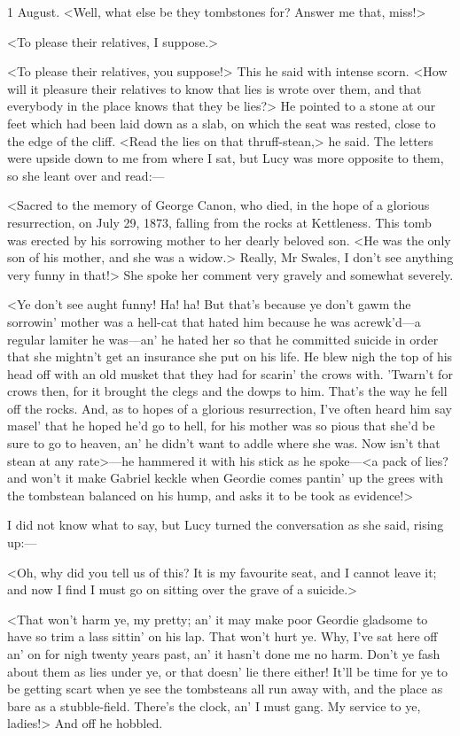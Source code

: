 \begin{diary}{1 August.}
<Well, what else be they tombstones for? Answer me that, miss!>

<To please their relatives, I suppose.>

<To please their relatives, you suppose!> This he said with intense scorn. <How will it pleasure their relatives to know that lies is wrote over them, and that everybody in the place knows that they be lies?> He pointed to a stone at our feet which had been laid down as a slab, on which the seat was rested, close to the edge of the cliff. <Read the lies on that thruff-stean,> he said. The letters were upside down to me from where I sat, but Lucy was more opposite to them, so she leant over and read:—

<Sacred to the memory of George Canon, who died, in the hope of a glorious resurrection, on July 29, 1873, falling from the rocks at Kettleness. This tomb was erected by his sorrowing mother to her dearly beloved son. <He was the only son of his mother, and she was a widow.> Really, Mr Swales, I don't see anything very funny in that!> She spoke her comment very gravely and somewhat severely.

<Ye don't see aught funny! Ha! ha! But that's because ye don't gawm the sorrowin' mother was a hell-cat that hated him because he was acrewk'd—a regular lamiter he was—an' he hated her so that he committed suicide in order that she mightn't get an insurance she put on his life. He blew nigh the top of his head off with an old musket that they had for scarin' the crows with. 'Twarn't for crows then, for it brought the clegs and the dowps to him. That's the way he fell off the rocks. And, as to hopes of a glorious resurrection, I've often heard him say masel' that he hoped he'd go to hell, for his mother was so pious that she'd be sure to go to heaven, an' he didn't want to addle where she was. Now isn't that stean at any rate>—he hammered it with his stick as he spoke—<a pack of lies? and won't it make Gabriel keckle when Geordie comes pantin' up the grees with the tombstean balanced on his hump, and asks it to be took as evidence!>

I did not know what to say, but Lucy turned the conversation as she said, rising up:—

<Oh, why did you tell us of this? It is my favourite seat, and I cannot leave it; and now I find I must go on sitting over the grave of a suicide.>

<That won't harm ye, my pretty; an' it may make poor Geordie gladsome to have so trim a lass sittin' on his lap. That won't hurt ye. Why, I've sat here off an' on for nigh twenty years past, an' it hasn't done me no harm. Don't ye fash about them as lies under ye, or that doesn' lie there either! It'll be time for ye to be getting scart when ye see the tombsteans all run away with, and the place as bare as a stubble-field. There's the clock, an' I must gang. My service to ye, ladies!> And off he hobbled.


\end{diary}

